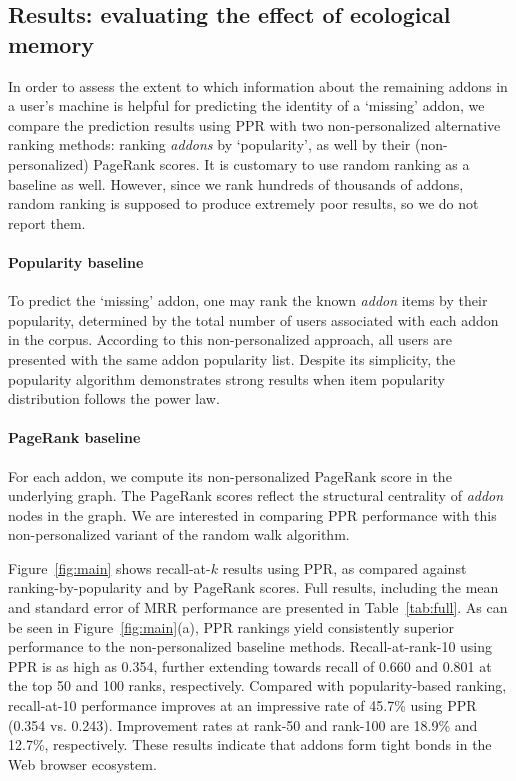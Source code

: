 \documentclass[ijoc,nonblindrev]{informs3} %
\numberwithin{equation}{subsection}
\begin{document}
\subsection{Results: evaluating the effect of ecological memory}
\label{sec:user_main_results}

In order to assess the extent to which information about the remaining addons in a user's machine is helpful for predicting the identity of a `missing' addon, we compare the prediction results using PPR with two non-personalized alternative ranking methods: ranking {\it addons} by `popularity', as well by their (non-personalized) PageRank scores. It is customary to use random ranking as a baseline as well. However, since we rank hundreds of thousands of addons, random ranking is supposed to produce extremely poor results, so we do not report them.

\paragraph{Popularity baseline} 

To predict the `missing' addon, one may rank the known {\it addon} items by their popularity, determined by the total number of users associated with each addon in the corpus. According to this non-personalized approach, all users are presented with the same addon popularity list. Despite its simplicity, the popularity algorithm demonstrates strong results when item popularity distribution follows the power law. 

\paragraph{PageRank baseline} 

For each addon, we compute its non-personalized PageRank score in the underlying graph. The PageRank scores reflect the structural centrality of {\it addon} nodes in the graph. We are interested in comparing PPR performance with this non-personalized variant of the random walk algorithm.

Figure~\ref{fig:main} shows recall-at-$k$ results using PPR, as compared against ranking-by-popularity and by PageRank scores. Full results, including the mean and standard error of MRR performance are presented in Table~\ref{tab:full}. As can be seen in Figure~\ref{fig:main}(a), PPR rankings yield consistently superior performance to the non-personalized baseline methods. Recall-at-rank-10 using PPR is as high as 0.354, further extending towards recall of 0.660 and 0.801 at the top 50 and 100 ranks, respectively. Compared with popularity-based ranking, recall-at-10 performance improves at an impressive rate of 45.7\% using PPR (0.354 vs. 0.243). Improvement rates at rank-50 and rank-100 are 18.9\% and 12.7\%, respectively. These results indicate that addons form tight bonds in the Web browser ecosystem. 
\end{document}
